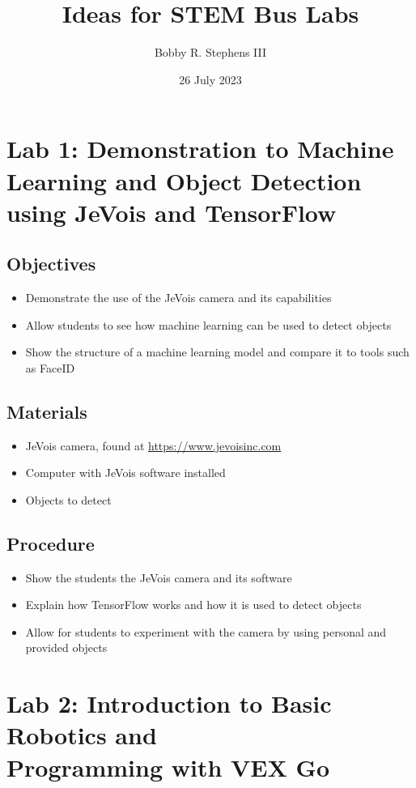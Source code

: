 \documentclass{article}
\title{Ideas for STEM Bus Labs}
\author{Bobby R. Stephens III}
\date{26 July 2023}
\begin{document}
\maketitle
\section*{Lab 1: Demonstration to Machine Learning and Object Detection using JeVois and TensorFlow}
    \subsection*{Objectives}
        \begin{itemize}
            \item Demonstrate the use of the JeVois camera and its capabilities
            \item Allow students to see how machine learning can be used to detect objects
            \item Show the structure of a machine learning model and compare it to tools such as FaceID
        \end{itemize}
    \subsection*{Materials}
        \begin{itemize}
            \item JeVois camera, found at \href{https://www.jevoisinc.com/products/jevois-a33-smart-machine-vision-camera?variant=36249051658}{https://www.jevoisinc.com}
            \item Computer with JeVois software installed
            \item Objects to detect
        \end{itemize}
    \subsection*{Procedure}
        \begin{itemize}
            \item Show the students the JeVois camera and its software
            \item Explain how TensorFlow works and how it is used to detect objects
            \item Allow for students to experiment with the camera by using personal and provided objects
        \end{itemize}
\pagebreak
\section*{Lab 2: Introduction to Basic Robotics and \\Programming with VEX Go}
\end{document}
